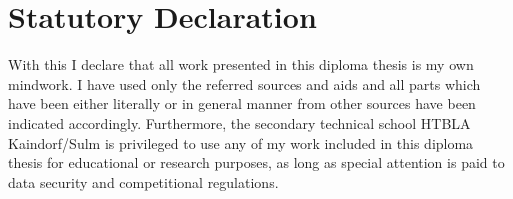 \chapter*{Statutory Declaration}
With this I declare that all work presented in this diploma thesis is my own mindwork. I have used only the referred sources and aids and all parts which have been either literally or in general manner from other sources have been indicated accordingly.
\newline \newline
Furthermore, the secondary technical school HTBLA Kaindorf/Sulm is privileged to use any of my work included in this diploma thesis for educational or research purposes, as long as special attention is paid to data security and competitional regulations.